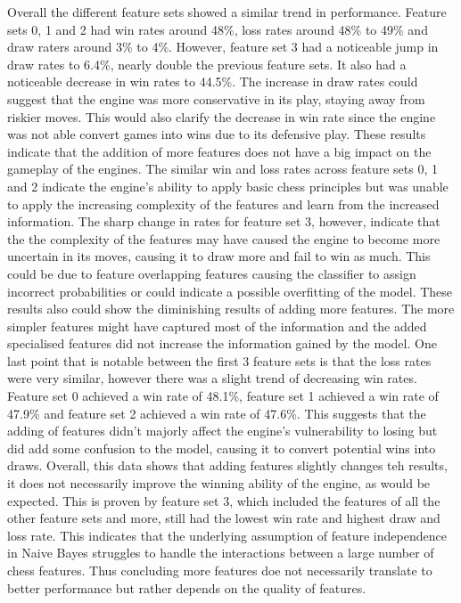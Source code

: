 




Overall the different feature sets showed a similar trend in performance. Feature sets 0, 1 and 2 had win rates around 48\%, loss rates around 48\% to 49\% and draw raters around 3\% to 4\%. However, feature set 3 had a noticeable jump in draw rates to 6.4\%, nearly double the previous feature sets. It also had a noticeable decrease in win rates to 44.5\%. The increase in draw rates could suggest that the engine was more conservative in its play, staying away from riskier moves. This would also clarify the decrease in win rate since the engine was not able convert games into wins due to its defensive play. These results indicate that the addition of more features does not have a big impact on the gameplay of the engines. The similar win and loss rates across feature sets 0, 1 and 2 indicate the engine's ability to apply basic chess principles but was unable to apply the increasing complexity of the features and learn from the increased information. The sharp change in rates for feature set 3, however, indicate that the the complexity of the features may have caused the engine to become more uncertain in its moves, causing it to draw more and fail to win as much. This could be due to feature overlapping features causing the classifier to assign incorrect probabilities \cite{ahmedOkNBEnhancedOPTICS2024} or could indicate a possible overfitting of the model. These results also could show the diminishing results of adding more features. The more simpler features might have captured most of the information and the added specialised features did not increase the information gained by the model. One last point that is notable between the first 3 feature sets is that the loss rates were very similar, however there was a slight trend of decreasing win rates. Feature set 0 achieved a win rate of 48.1\%, feature set 1 achieved a win rate of 47.9\% and feature set 2 achieved a win rate of 47.6\%. This suggests that the adding of features didn't majorly affect the engine's vulnerability to losing but did add some confusion to the model, causing it to convert potential wins into draws. Overall, this data shows that adding features slightly changes teh results, it does not necessarily improve the winning ability of the engine, as would be expected. This is proven by feature set 3, which included the features of all the other feature sets and more, still had the lowest win rate and highest draw and loss rate. This indicates that the underlying assumption of feature independence in Naive Bayes struggles to handle the interactions between a large number of chess features. Thus concluding more features doe not necessarily translate to better performance but rather depends on the quality of features. 

